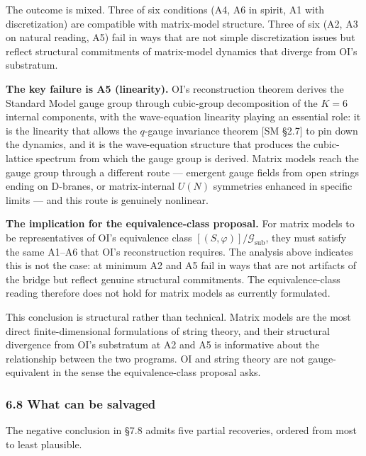 \documentclass[
]{article}
\begin{document}
The outcome is mixed. Three of six conditions (A4, A6 in spirit, A1 with
discretization) are compatible with matrix-model structure. Three of six
(A2, A3 on natural reading, A5) fail in ways that are not simple
discretization issues but reflect structural commitments of matrix-model
dynamics that diverge from OI's substratum.

\textbf{The key failure is A5 (linearity).} OI's reconstruction theorem
derives the Standard Model gauge group through cubic-group decomposition
of the \(K = 6\) internal components, with the wave-equation linearity
playing an essential role: it is the linearity that allows the
\(q\)-gauge invariance theorem {[}SM §2.7{]} to pin down the dynamics,
and it is the wave-equation structure that produces the cubic-lattice
spectrum from which the gauge group is derived. Matrix models reach the
gauge group through a different route --- emergent gauge fields from
open strings ending on D-branes, or matrix-internal \(U(N)\) symmetries
enhanced in specific limits --- and this route is genuinely nonlinear.

\textbf{The implication for the equivalence-class proposal.} For matrix
models to be representatives of OI's equivalence class
\([(S, \varphi)]/\mathcal{G}_{\text{sub}}\), they must satisfy the same
A1--A6 that OI's reconstruction requires. The analysis above indicates
this is not the case: at minimum A2 and A5 fail in ways that are not
artifacts of the bridge but reflect genuine structural commitments. The
equivalence-class reading therefore does not hold for matrix models as
currently formulated.

This conclusion is structural rather than technical. Matrix models are
the most direct finite-dimensional formulations of string theory, and
their structural divergence from OI's substratum at A2 and A5 is
informative about the relationship between the two programs. OI and
string theory are not gauge-equivalent in the sense the
equivalence-class proposal asks.

\hypertarget{what-can-be-salvaged}{%
\subsubsection{6.8 What can be salvaged}\label{what-can-be-salvaged}}

The negative conclusion in §7.8 admits five partial recoveries, ordered
from most to least plausible.
\end{document}
